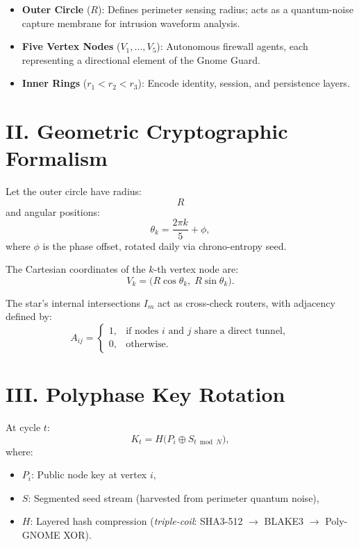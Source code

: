 \begin{itemize}
    \item \textbf{Outer Circle} ($R$): Defines perimeter sensing radius; acts as a quantum-noise capture membrane for intrusion waveform analysis.
    \item \textbf{Five Vertex Nodes} ($V_{1}, \dots, V_{5}$): Autonomous firewall agents, each representing a directional element of the Gnome Guard.
    \item \textbf{Inner Rings} ($r_{1} < r_{2} < r_{3}$): Encode identity, session, and persistence layers.
\end{itemize}

\section*{II. Geometric Cryptographic Formalism}
Let the outer circle have radius:
\[
  R
\]
and angular positions:
\[
  \theta_k = \frac{2\pi k}{5} + \phi,
\]
where $\phi$ is the phase offset, rotated daily via chrono-entropy seed.

The Cartesian coordinates of the $k$-th vertex node are:
\[
  V_k = \bigl( R \cos \theta_k,\; R \sin \theta_k \bigr).
\]

The star’s internal intersections $I_{m}$ act as cross-check routers, with adjacency defined by:
\[
  A_{ij} =
  \begin{cases}
    1, & \text{if nodes $i$ and $j$ share a direct tunnel}, \\
    0, & \text{otherwise}.
  \end{cases}
\]

\section*{III. Polyphase Key Rotation}
At cycle $t$:
\[
  K_t = H\!\bigl( P_i \oplus S_{t \bmod N} \bigr),
\]
where:
\begin{itemize}
    \item $P_i$: Public node key at vertex $i$,
    \item $S$: Segmented seed stream (harvested from perimeter quantum noise),
    \item $H$: Layered hash compression (\emph{triple-coil}: SHA3-512 $\rightarrow$ BLAKE3 $\rightarrow$ Poly-GNOME XOR).
\end{itemize}

